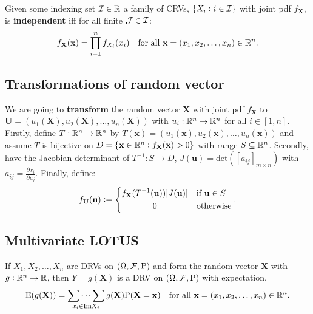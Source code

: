 \begingroup\belowdisplayskip=-10pt
\begin{definition}
    Given some indexing set $\mathcal{I}\in\mathbb{R}$ a family of CRVs, $\{X_i:i\in\mathcal{I}\}$ with joint pdf $f_\textbf{X}$, is \textbf{independent} iff for all finite $\mathcal{J}\in\mathcal{I}$: \[
        f_{\textbf{X}}(\textbf{x}) = \prod_{i=1}^nf_{X_i}(x_i) \quad \text{\textcolor{black}{for all }$\textbf{x}=(x_1,x_2,\ldots,x_n)\in\mathbb{R}^n$}
    \textcolor{black}{.}\]
\end{definition}
\endgroup

\subsection{Transformations of random vector}
\begin{definition}[Transformation]
    We are going to \textbf{transform} the random vector $\textbf{X}$ with joint pdf $f_\textbf{X}$ to $\textbf{U}=(u_1(\textbf{X}),u_2(\textbf{X}),\ldots,u_n(\textbf{X}))$ with $u_i: \mathbb{R}^n \rightarrow \mathbb{R}^n$ for all $i\in[1,n]$. Firstly, define $T:\mathbb{R}^n\rightarrow\mathbb{R}^n$ by $T(\textbf{x})=(u_1(\textbf{x}),u_2(\textbf{x}),\ldots,u_n(\textbf{x}))$ and assume $T$ is bijective on $D=\{\textbf{x}\in\mathbb{R}^n:f_\textbf{X}(\textbf{x})>0\}$ with range $S\subseteq\mathbb{R}^n$. Secondly, have the Jacobian determinant of $T^{-1}:S\rightarrow D$, $J(\textbf{u})=\text{det}([a_{ij}]_{m\times n})$ with $a_{ij}=\frac{\partial x_i}{\partial u_j}$. Finally, define: \[
        f_\textbf{U}(\textbf{u}) := \begin{dcases}
            f_\textbf{X}(T^{-1}(\textbf{u}))|J(\textbf{u})| & \text{\textcolor{black}{if }$\textbf{u}\in S$} \\
            \omit\hfil0\hfil & \text{\textcolor{black}{otherwise}}
        \end{dcases}\textcolor{black}{.}
    \]
\end{definition}
\subsection{Multivariate LOTUS}
\begingroup\belowdisplayskip=-10pt
\begin{theorem}
    If $X_1,X_2,\ldots,X_n$ are DRVs on $(\Omega,\mathcal{F},\mathrm{P})$ and form the random vector $\textbf{X}$ with $g:\mathbb{R}^n\rightarrow\mathbb{R}$, then $Y=g(\textbf{X})$ is a DRV on $(\Omega,\mathcal{F},\mathrm{P})$ with expectation, \[
    \mathrm{E}(g(\textbf{X}))=\mathop{\sum\dots\sum}_{x_i\in\text{Im}X_i}g(\textbf{X})\mathrm{P}(\textbf{X}=\textbf{x})
    \quad \text{\textcolor{black}{for all }$\textbf{x}=(x_1,x_2,\ldots,x_n)\in\mathbb{R}^n$}
    \textcolor{black}{.}
    \]
\end{theorem}

